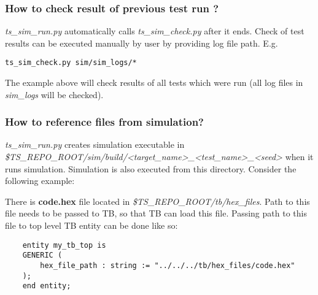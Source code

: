 \documentclass{tropic_design_spec}
\begin{document}
\subsubsection{How to check result of previous test run ?}
\label{sec:how-to-check-result-of-previous-test-run}

\textit{ts_sim_run.py} automatically calls \textit{ts_sim_check.py} after it ends. Check
of test results can be executed manually by user by providing log file path. E.g.

\begin{lstlisting}
ts_sim_check.py sim/sim_logs/*
\end{lstlisting}

The example above will check results of all tests which were run (all log files in
\textit{sim_logs} will be checked).


\subsubsection{How to reference files from simulation?}
\label{sec:how-to-reference-files-from-simulation}

\textit{ts_sim_run.py} creates simulation executable in
\textit{\$TS_REPO_ROOT/sim/build/<target_name>_<test_name>_<seed>} when it runs simulation.
Simulation is also executed from this directory. Consider the following example:

\vspace{0.5cm}

There is \textbf{code.hex} file located in \textit{\$TS_REPO_ROOT/tb/hex_files}. Path to
this file needs to be passed to TB, so that TB can load this file. Passing path to this
file to top level TB entity can be done like so:

\begin{lstlisting}
    entity my_tb_top is
    GENERIC (
        hex_file_path : string := "../../../tb/hex_files/code.hex"
    );
    end entity;
\end{lstlisting}

\end{document}
